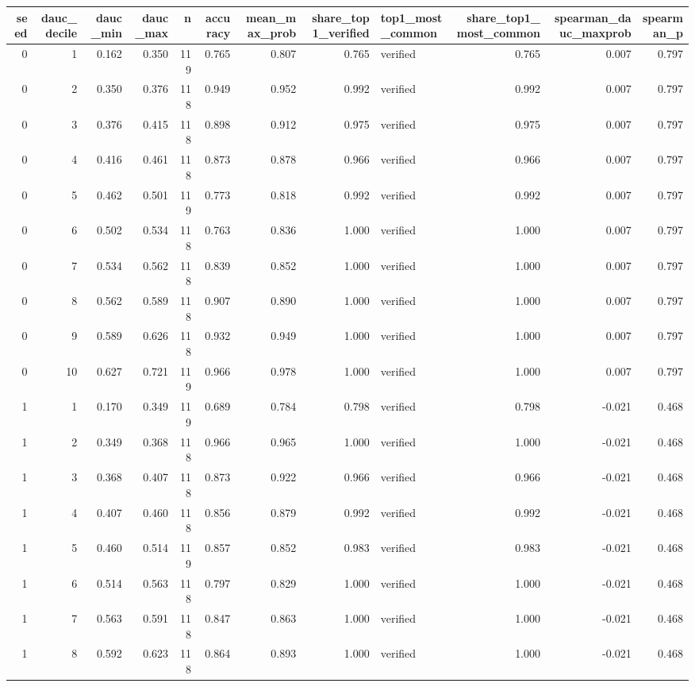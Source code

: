 \begin{tabular}{rrrrrrrrlrrr}
\toprule
seed & dauc_decile & dauc_min & dauc_max & n & accuracy & mean_max_prob & share_top1_verified & top1_most_common & share_top1_most_common & spearman_dauc_maxprob & spearman_p \\
\midrule
0 & 1 & 0.162 & 0.350 & 119 & 0.765 & 0.807 & 0.765 & verified & 0.765 & 0.007 & 0.797 \\
0 & 2 & 0.350 & 0.376 & 118 & 0.949 & 0.952 & 0.992 & verified & 0.992 & 0.007 & 0.797 \\
0 & 3 & 0.376 & 0.415 & 118 & 0.898 & 0.912 & 0.975 & verified & 0.975 & 0.007 & 0.797 \\
0 & 4 & 0.416 & 0.461 & 118 & 0.873 & 0.878 & 0.966 & verified & 0.966 & 0.007 & 0.797 \\
0 & 5 & 0.462 & 0.501 & 119 & 0.773 & 0.818 & 0.992 & verified & 0.992 & 0.007 & 0.797 \\
0 & 6 & 0.502 & 0.534 & 118 & 0.763 & 0.836 & 1.000 & verified & 1.000 & 0.007 & 0.797 \\
0 & 7 & 0.534 & 0.562 & 118 & 0.839 & 0.852 & 1.000 & verified & 1.000 & 0.007 & 0.797 \\
0 & 8 & 0.562 & 0.589 & 118 & 0.907 & 0.890 & 1.000 & verified & 1.000 & 0.007 & 0.797 \\
0 & 9 & 0.589 & 0.626 & 118 & 0.932 & 0.949 & 1.000 & verified & 1.000 & 0.007 & 0.797 \\
0 & 10 & 0.627 & 0.721 & 119 & 0.966 & 0.978 & 1.000 & verified & 1.000 & 0.007 & 0.797 \\
1 & 1 & 0.170 & 0.349 & 119 & 0.689 & 0.784 & 0.798 & verified & 0.798 & -0.021 & 0.468 \\
1 & 2 & 0.349 & 0.368 & 118 & 0.966 & 0.965 & 1.000 & verified & 1.000 & -0.021 & 0.468 \\
1 & 3 & 0.368 & 0.407 & 118 & 0.873 & 0.922 & 0.966 & verified & 0.966 & -0.021 & 0.468 \\
1 & 4 & 0.407 & 0.460 & 118 & 0.856 & 0.879 & 0.992 & verified & 0.992 & -0.021 & 0.468 \\
1 & 5 & 0.460 & 0.514 & 119 & 0.857 & 0.852 & 0.983 & verified & 0.983 & -0.021 & 0.468 \\
1 & 6 & 0.514 & 0.563 & 118 & 0.797 & 0.829 & 1.000 & verified & 1.000 & -0.021 & 0.468 \\
1 & 7 & 0.563 & 0.591 & 118 & 0.847 & 0.863 & 1.000 & verified & 1.000 & -0.021 & 0.468 \\
1 & 8 & 0.592 & 0.623 & 118 & 0.864 & 0.893 & 1.000 & verified & 1.000 & -0.021 & 0.468 \\

\end{tabular}

